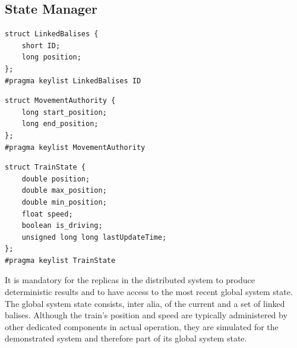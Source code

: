 \subsection{State Manager}

\begin{lstlisting}[caption={\abr{IDL} definition for the \texttt{LinkedBalises} topic. Each linked balise has an unique identifier and a position that is communicated to the system by the \abr{RBC}.}, label=code:linkedBalises]
struct LinkedBalises {
    short ID;
    long position;
};
#pragma keylist LinkedBalises ID
\end{lstlisting}

\begin{lstlisting}[caption={\abr{IDL} definition for the \texttt{MovementAuthority} topic. The \texttt{start\_position} encodes where the \abr{MA} starts and the \texttt{end\_position} encodes until where it is valid.}, label=code:movementAuthority]
struct MovementAuthority {
    long start_position;
    long end_position;
};
#pragma keylist MovementAuthority
\end{lstlisting}

\begin{lstlisting}[caption={\abr{IDL} definition for the \texttt{TrainState} topic. The train's state consists of a current position and a current speed. Due to inaccuracies of the position sensors, a train's position cannot be determined exactly. Therefore, a confidence interval is maintained that defines an area where the train certainly is. This area is bounded by \texttt{max\_position} and \texttt{min\_position}. With \texttt{is\_driving} it is encoded whether the virtual train drives or stands still. The \texttt{lastUpdateTime} variable is used to simulate the train's position based on its speed.}, label=code:trainState]
struct TrainState {
    double position;
    double max_position;
    double min_position;
    float speed;
    boolean is_driving;
    unsigned long long lastUpdateTime;
};
#pragma keylist TrainState
\end{lstlisting}

It is mandatory for the replicas in the distributed system to produce deterministic results and to have access to the most recent global system state.
The global system state consists, inter alia, of the current  and a set of linked balises.
Although the train's position and speed are typically administered by other dedicated components in actual operation, they are simulated for the demonstrated system and therefore part of its global system state.
\\

